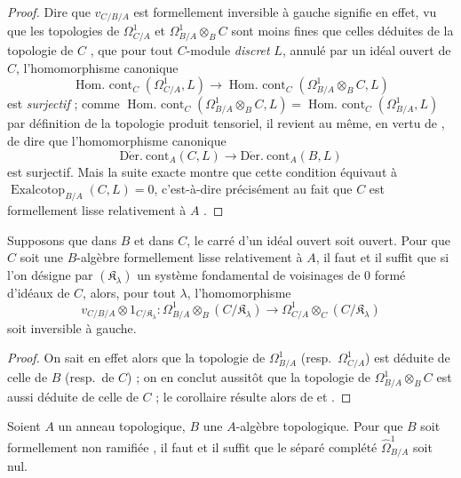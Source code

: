 \begin{proof}
Dire que $v_{C/B/A}$ est formellement inversible à gauche signifie en effet,
vu que les topologies de $\Omega^1_{C/A}$ et $\Omega^1_{B/A}\otimes_B C$
sont moins fines que celles déduites de la topologie de $C$
, que pour tout $C$-module \emph{discret} $L$, annulé par un
idéal ouvert de $C$, l'homomorphisme canonique
\[
  \operatorname{Hom.\ cont}_C(\Omega^1_{C/A},L)\to
  \operatorname{Hom.\ cont}_C(\Omega^1_{B/A}\otimes_B C,L)
\]
est \emph{surjectif}  ; comme
$\operatorname{Hom.\ cont}_C(\Omega^1_{B/A}\otimes_B C,L)=
\operatorname{Hom.\ cont}_C(\Omega^1_{B/A},L)$ par définition de la topologie
produit tensoriel, il revient au même, en vertu de , de dire
que l'homomorphisme canonique
\[
  \operatorname{D\acute{e}r.\ cont}_A(C,L)\to
  \operatorname{D\acute{e}r.\ cont}_A(B,L)
\]
est surjectif. Mais la suite exacte  montre que cette
condition équivaut à $\operatorname{Exalcotop}_{B/A}(C,L)=0$, c'est-à-dire
précisément au fait que $C$ est formellement lisse relativement à $A$
.
\end{proof}

\begin{corollary}[20.7.3]
\label{0.20.7.3-fr}
Supposons que dans $B$ et dans $C$, le carré d'un idéal ouvert soit ouvert.
Pour que $C$ soit une $B$-algèbre formellement lisse relativement à $A$, il
faut et il suffit que si l'on désigne par $(\mathfrak{K}_\lambda)$ un système
fondamental de voisinages de $0$ formé d'idéaux de $C$, alors, pour tout
$\lambda$, l'homomorphisme
\begin{equation}
\tag{20.7.3.1}
\label{0.20.7.3.1-fr}
  v_{C/B/A}\otimes 1_{C/\mathfrak{K}_\lambda}:
  \Omega^1_{B/A}\otimes_B(C/\mathfrak{K}_\lambda)\to
  \Omega^1_{C/A}\otimes_C(C/\mathfrak{K}_\lambda)
\end{equation}
soit inversible à gauche.
\end{corollary}

\begin{proof}
On sait en effet alors que la topologie de $\Omega^1_{B/A}$ (resp.\
$\Omega^1_{C/A}$) est déduite de celle de $B$ (resp.\ de $C$)
 ; on en conclut aussitôt que la topologie de
$\Omega^1_{B/A}\otimes_B C$ est aussi déduite de celle de $C$ ; le corollaire
résulte alors de \sref{0.20.7.2-fr} et \sref{0.19.1.7-fr}.
\end{proof}

\begin{proposition}[20.7.4]
\label{0.20.7.4-fr}
Soient $A$ un anneau topologique, $B$ une $A$-algèbre topologique. Pour que
$B$ soit formellement non ramifiée \textup{\sref{0.19.10.2-fr}}, il faut et il suffit
que le séparé complété $\widehat{\Omega}^1_{B/A}$ soit nul.
\end{proposition}

